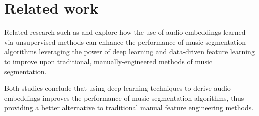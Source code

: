 \section{Related work}

Related research such as \cite{SalamonDeepSegmentation} and \cite{deepfeaturesegment} explore how the use of audio embeddings learned via unsupervised methods can enhance the performance of music segmentation algorithms leveraging the power of deep learning and data-driven feature learning to improve upon traditional, manually-engineered methods of music segmentation. 

Both studies conclude that using deep learning techniques to derive audio embeddings improves the performance of music segmentation algorithms, thus providing a better alternative to traditional manual feature engineering methods.

